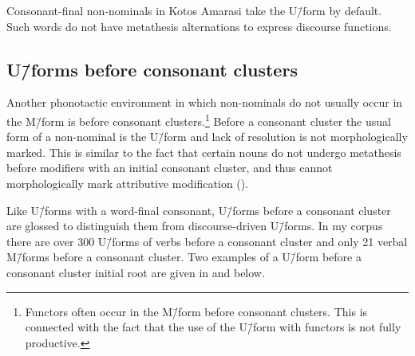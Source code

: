 \begin{exe}\let\eachwordtwo=\itshape
	\label{ex:08/10/14, p.113}
	\label{ex:09/10/14, p.114}
\end{exe}

Consonant-final non-nominals in Kotos
Amarasi take the U\=/form by default.
Such words do not have metathesis alternations
to express discourse functions.

\subsection{U\=/forms before consonant clusters}\label{sec:VerBefCC}
Another phonotactic environment in which non-nominals
do not usually occur in the M\=/form is before consonant clusters.\footnote{
		Functors often occur in the M\=/form before consonant clusters.
		This is connected with the fact that the use of the U\=/form
		with functors is not fully productive.}
Before a consonant cluster the usual form of a non-nominal is
the U\=/form and lack of resolution is not morphologically marked.
This is similar to the fact that certain nouns do
not undergo metathesis before modifiers with an initial consonant cluster,
and thus cannot morphologically mark attributive modification ().

Like U\=/forms with a word-final consonant, U\=/forms before a consonant cluster
are glossed {\Uc} to distinguish them from discourse-driven U\=/forms.
In my corpus there are over 300 U\=/forms of verbs before a consonant
cluster and only 21 verbal M\=/forms before a consonant cluster.
Two examples of a U\=/form before a consonant cluster initial root are given in
 and  below.

